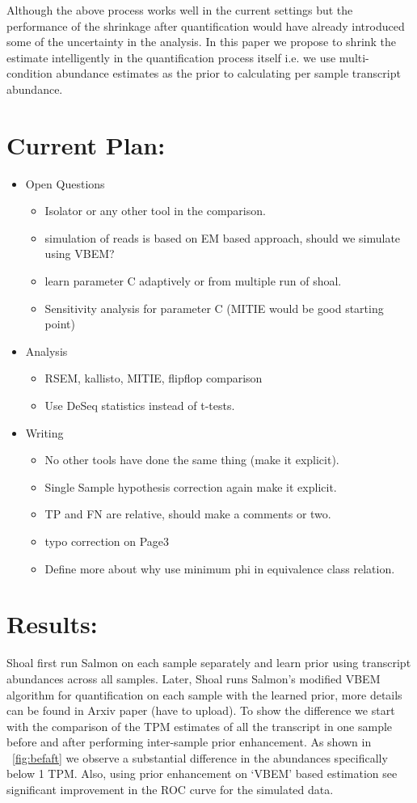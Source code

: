 \documentclass{article}
\begin{document}
Although the above process works well in the current settings but the performance of the shrinkage after quantification would have
already introduced some of the uncertainty in the analysis. In this paper we propose to shrink the estimate intelligently in the
quantification process itself i.e. we use multi-condition abundance estimates as the prior to calculating per sample transcript abundance. 


\section{Current Plan:}
\begin{itemize}
	\item Open Questions
		\begin{itemize}
			\item Isolator or any other tool in the comparison.
			\item simulation of reads is based on EM based approach, should we simulate using VBEM?
			\item learn parameter C adaptively or from multiple run of shoal.
			\item Sensitivity analysis for parameter C (MITIE would be good starting point)
		\end{itemize}
	\item Analysis
	\begin{itemize}
		\item RSEM, kallisto, MITIE, flipflop comparison
		\item Use DeSeq statistics instead of t-tests.
	\end{itemize}
	\item Writing
	\begin{itemize}
		\item No other tools have done the same thing (make it explicit).
		\item Single Sample hypothesis correction again make it explicit.
		\item TP and FN are relative, should make a comments or two.
		\item typo correction on Page3
		\item Define more about why use minimum phi in equivalence class relation.
	\end{itemize}
\end{itemize}

\section{Results:}
Shoal first run Salmon on each sample separately and learn prior using transcript abundances across all samples. Later, Shoal runs Salmon's modified VBEM algorithm for quantification on each sample with the learned prior, more details can be found in Arxiv paper (have to upload). To show the difference we start with the comparison of the TPM estimates of all the transcript in one sample before and after performing inter-sample prior enhancement. As shown in ~\cref{fig:befaft} we observe a substantial difference in the abundances specifically below 1 TPM. Also, using prior enhancement on `VBEM' based estimation see significant improvement in the ROC curve for the simulated data. 
\end{document}
